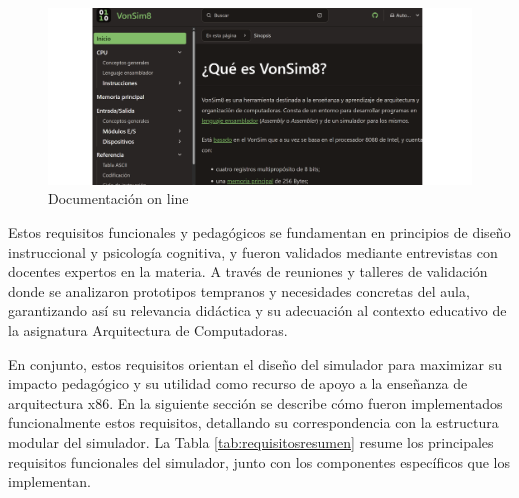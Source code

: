 \documentclass[12pt,oneside]{templates/unerthesis}
\begin{document}
\begin{figure}

{\centering \includegraphics[width=0.9\linewidth]{images/documentacion} 

}

\caption{Documentación on line}\label{fig:documentacion}
\end{figure}

Estos requisitos funcionales y pedagógicos se fundamentan en principios de diseño instruccional y psicología cognitiva, y fueron validados mediante entrevistas con docentes expertos en la materia. A través de reuniones y talleres de validación donde se analizaron prototipos tempranos y necesidades concretas del aula, garantizando así su relevancia didáctica y su adecuación al contexto educativo de la asignatura Arquitectura de Computadoras.

En conjunto, estos requisitos orientan el diseño del simulador para maximizar su impacto pedagógico y su utilidad como recurso de apoyo a la enseñanza de arquitectura x86. En la siguiente sección se describe cómo fueron implementados funcionalmente estos requisitos, detallando su correspondencia con la estructura modular del simulador. La Tabla \ref{tab:requisitosresumen} resume los principales requisitos funcionales del simulador, junto con los componentes específicos que los implementan.
\end{document}
